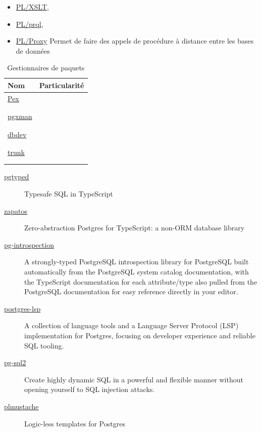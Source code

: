 \documentclass[a4paper,12pt]{article}
\begin{document}
\begin{multicols*}{2}
\begin{itemize}
\item \href{https://github.com/petere/plxslt}{PL/XSLT},
\item \href{https://github.com/kaspermarstal/plprql}{PL/prql},
\item \href{https://github.com/plproxy/plproxy}{PL/Proxy} Permet de faire des appels de procédure à distance entre les bases de données
\end{itemize}

\begin{table}[H]
\caption{Gestionnaires de paquets}
\centering
\begin{tabular}{ll}
Nom & Particularité\\
\hline
\href{https://github.com/petere/pex}{Pex} & \\
 & \\
 & \\
\href{https://github.com/pgxman/pgxman}{pgxman} & \\
 & \\
 & \\
\href{https://github.com/supabase/dbdev}{dbdev} & \\
 & \\
 & \\
\href{https://github.com/tembo-io/trunk}{trunk} & \\
 & \\
 & \\
\end{tabular}
\end{table}

\begin{description}
\item[{\href{https://github.com/adelsz/pgtyped}{pgtyped}}] Typesafe SQL in TypeScript
\item[{\href{https://github.com/jawj/zapatos?tab=readme-ov-file}{zapatos}}] Zero-abstraction Postgres for TypeScript: a non-ORM database library
\item[{\href{https://github.com/graphile/crystal/tree/main/utils/pg-introspection}{pg-introspection}}] A strongly-typed PostgreSQL introspection library for PostgreSQL built automatically from the PostgreSQL system catalog documentation, with the TypeScript documentation for each attribute/type also pulled from the PostgreSQL documentation for easy reference directly in your editor.
\item[{\href{https://github.com/supabase-community/postgres\_lsp}{postgres-lsp}}] A collection of language tools and a Language Server Protocol (LSP) implementation for Postgres, focusing on developer experience and reliable SQL tooling.
\item[{\href{https://github.com/graphile/crystal/tree/main/utils/pg-sql2}{pg-sql2}}] Create highly dynamic SQL in a powerful and flexible manner without opening yourself to SQL injection attacks.
\item[{\href{https://github.com/PostgREST/plmustache}{plmustache}}] Logic-less templates for Postgres
\end{description}



\end{multicols*}
\end{document}
